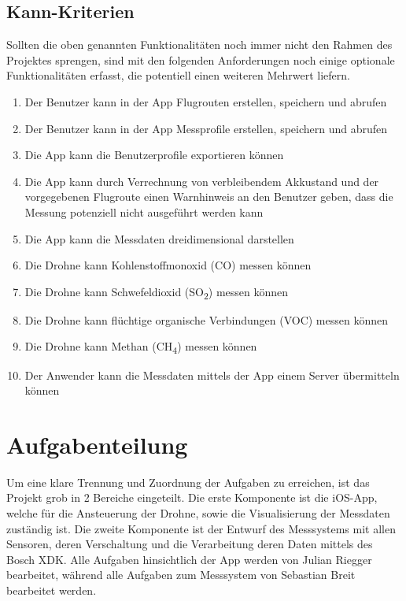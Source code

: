 \subsection{Kann-Kriterien}\label{subsec:KannKrit}
Sollten die oben genannten Funktionalitäten noch immer nicht den Rahmen des Projektes sprengen, sind mit den folgenden Anforderungen noch einige optionale Funktionalitäten erfasst, die potentiell einen weiteren Mehrwert liefern.
\newline
\begin{enumerate}[label=\roman*.]
	\item Der Benutzer kann in der App Flugrouten erstellen, speichern und abrufen 
	\item Der Benutzer kann in der App Messprofile erstellen, speichern und abrufen 
	\item Die App kann die Benutzerprofile exportieren können
	\item Die App kann durch Verrechnung von verbleibendem Akkustand und der vorgegebenen Flugroute einen Warnhinweis an den Benutzer geben, dass die Messung potenziell nicht ausgeführt werden kann
	\item Die App kann die Messdaten dreidimensional darstellen
	\item Die Drohne kann Kohlenstoffmonoxid (CO) messen können
	\item Die Drohne kann Schwefeldioxid (SO\textsubscript{2}) messen können
	\item Die Drohne kann flüchtige organische Verbindungen (VOC) messen können
	\item Die Drohne kann Methan (CH\textsubscript{4}) messen können	
	\item Der Anwender kann die Messdaten mittels der App einem Server übermitteln können	
\end{enumerate}
\section{Aufgabenteilung}\label{sec:Aufgabenteilung}
Um eine klare Trennung und Zuordnung der Aufgaben zu erreichen, ist das Projekt grob in 2 Bereiche eingeteilt. 
\newline
Die erste Komponente ist die iOS-App, welche für die Ansteuerung der Drohne, sowie die Visualisierung der Messdaten zuständig ist.
\newline
Die zweite Komponente ist der Entwurf des Messsystems mit allen Sensoren, deren Verschaltung und die Verarbeitung deren Daten mittels des Bosch \acs{XDK}.
\newline
\newline
Alle Aufgaben hinsichtlich der App werden von Julian Riegger bearbeitet, während alle Aufgaben zum Messsystem von Sebastian Breit bearbeitet werden.
